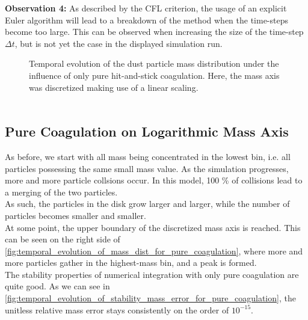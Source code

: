         \textbf{Observation 4:} As described by the CFL criterion, the usage of an explicit 
        Euler algorithm will lead to a breakdown of the method when the time-steps become too 
        large. This can be observed when increasing the size of the time-step $\Delta t$,
        but is not yet the case in the displayed simulation run.

        \vfill

        \begin{figure}[h!]
            \caption{ 
                Temporal evolution of the dust particle mass distribution under the 
                influence of only pure hit-and-stick coagulation. Here, the mass axis 
                was discretized making use of a linear scaling. \\ \
            }
        \end{figure}


    \cleardoublepage\subsection{Pure Coagulation on Logarithmic Mass Axis}
    \label{sec:integration_results_pure_coagulation_on_log_mass_axis}

        As before, we start with all mass being concentrated in the lowest bin, i.e. all 
        particles possessing the same small mass value. As the simulation progresses, more 
        and more particle collsions occur. In this model, 100 \% of collisions lead to a 
        merging of the two particles. \\

        As such, the particles in the disk grow larger and larger, while the number of particles 
        becomes smaller and smaller. \\

        At some point, the upper boundary of the discretized mass axis is reached. This can be 
        seen on the right side of \cref{fig:temporal_evolution_of_mass_dist_for_pure_coagulation},
        where more and more particles gather in the highest-mass bin, and a peak is formed. \\

        The stability properties of numerical integration with only pure coagulation
        are quite good. As we can see in 
        \cref{fig:temporal_evolution_of_stability_mass_error_for_pure_coagulation},
        the unitless relative mass error stays consistently on the order of $10^{-15}$. \\
        
